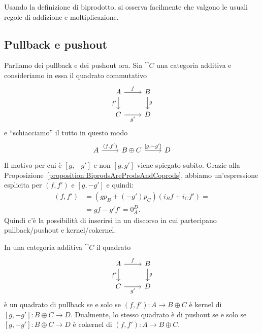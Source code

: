 Usando la definizione di biprodotto, si osserva facilmente che valgono
le usuali regole di addizione e moltiplicazione.



\subsection{Pullback e pushout}

Parliamo dei pullback e dei pushout ora. Sia \(\cat C\) una categoria
additiva e consideriamo in essa il quadrato commutativo
\[
  \begin{tikzcd}
    A \ar["{f}", r] \ar["{f'}", d, swap] & B \ar["{g}", d] \\
    C \ar["{g'}", r, swap] & D
  \end{tikzcd}
\]
e ``schiacciamo'' il tutto in questo modo
\[
  \begin{tikzcd}
    A \ar["{(f, f')}", r] & B \oplus C \ar["{[g, -g']}", r] & D
  \end{tikzcd}
\]
Il motivo per cui è \([g, -g']\) e non \([g, g']\) viene spiegato
subito. Grazie alla
Proposizione~\ref{proposition:BiprodsAreProdsAndCoprods}, abbiamo
un'espressione esplicita per \((f,f')\) e \([g,-g']\) e quindi:
\begin{align*} [g, -g'] (f, f') &= (g p_B + (-g') p_C) (i_B f + i_C f') = \\
                                &= g f - g' f' = 0_A^D .
\end{align*}
Quindi c'è la possibilità di inserirsi in un discorso in cui partecipano
pullback/pushout e kernel/cokernel.

\begin{proposition}\label{proposition:FromPullbackToKernel}
  In una categoria additiva \(\cat C\) il quadrato
  \[
    \begin{tikzcd}
      A \ar["{f}", r] \ar["{f'}", d, swap] & B \ar["{g}", d] \\
      C \ar["{g'}", r, swap] & D
    \end{tikzcd}
  \]
  è un quadrato di pullback se e solo se \((f, f') : A \to B \oplus C\)
  è kernel di \([g, -g'] : B \oplus C \to D\). Dualmente, lo stesso
  quadrato è di pushout se e solo se \([g, -g'] : B \oplus C \to D\) è
  cokernel di \((f, f') : A \to B \oplus C\).
\end{proposition}

